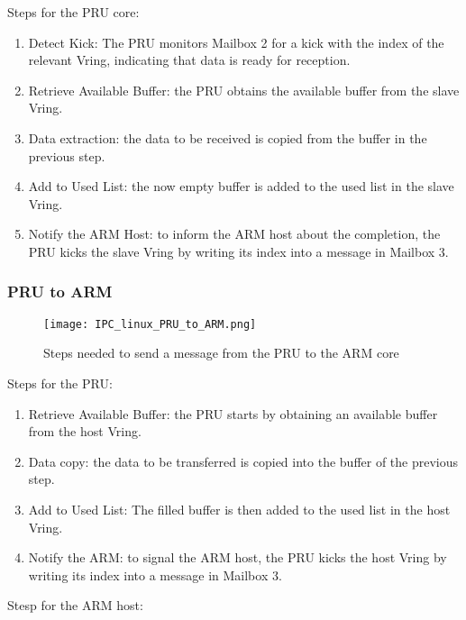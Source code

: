 Steps for the PRU core:

\begin{enumerate}
    \item   Detect Kick: The PRU monitors Mailbox 2 for a kick with the index
            of the relevant Vring, indicating that data is ready for reception.
    \item   Retrieve Available Buffer: the PRU obtains the available buffer
            from the slave Vring.
    \item   Data extraction: the data to be received is copied from the buffer
            in the previous step.
    \item   Add to Used List: the now empty buffer is added to the used list
            in the slave Vring.
    \item   Notify the ARM Host: to inform the ARM host about the completion,
            the PRU kicks the slave Vring by writing its index into a message
            in Mailbox 3.
\end{enumerate}

\subsubsection{PRU to ARM}

\begin{figure}[ht]
    \centering
    \texttt{[image: IPC\_linux\_PRU\_to\_ARM.png]}
    \caption{Steps needed to send a message from the PRU to the ARM core}
\end{figure}

Steps for the PRU:

\begin{enumerate}
    \item   Retrieve Available Buffer: the PRU starts by obtaining an
            available buffer from the host Vring.
    \item   Data copy: the data to be transferred is copied into the buffer 
            of the previous step.
    \item   Add to Used List: The filled buffer is then added to the
            used list in the host Vring.
    \item   Notify the ARM: to signal the ARM host, the PRU kicks the host 
            Vring by writing its index into a message in Mailbox 3.
\end{enumerate}

Stesp for the ARM host:

